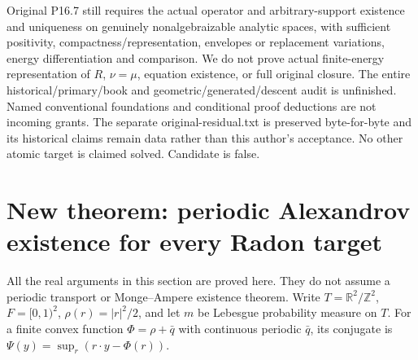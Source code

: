 \documentclass[11pt]{article}
\begin{document}
Original P16.7 still requires the actual operator and arbitrary-support
existence and uniqueness on genuinely nonalgebraizable analytic spaces,
with sufficient positivity, compactness/representation, envelopes or
replacement variations, energy differentiation and comparison. We do not
prove actual finite-energy representation of $R$, $\nu=\mu$, equation
existence, or full original closure. The entire historical/primary/book
and geometric/generated/descent audit is unfinished. Named conventional
foundations and conditional proof deductions are not incoming grants.
The separate original-residual.txt is preserved byte-for-byte and its
historical claims remain data rather than this author's acceptance.
No other atomic target is claimed solved. Candidate is false.


\section{New theorem: periodic Alexandrov existence for every Radon target}
All the real arguments in this section are proved here. They do not assume
a periodic transport or Monge--Ampere existence theorem. Write
$T=\mathbb R^2/\mathbb Z^2$, $F=[0,1)^2$, $\rho(r)=|r|^2/2$, and let
$m$ be Lebesgue probability measure on $T$. For a finite convex function
$\Phi=\rho+\bar q$ with continuous periodic $\bar q$, its conjugate is
$\Psi(y)=\sup_r(r\cdot y-\Phi(r))$.
\end{document}
